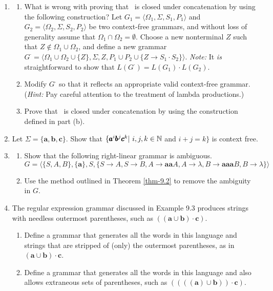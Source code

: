 \begin{enumerate}[{9.}1.]
\item \begin{enumerate}
\item What is wrong with proving that \CSIG\ is closed under concatenation by
using the following construction? Let $G_1 = \langle\Omega_1,\Sigma,S_1,P_1
\rangle$ and $G_2 = \langle\Omega_2,\Sigma,S_2,P_2\rangle$ be two context-free
grammars, and without loss of generality assume that $\Omega_1\cap\Omega_2 =
\emptyset$. Choose a new nonterminal $Z$ such that $Z\not \in\Omega_1\cup\Omega_2$,
and define a new grammar $G^{\cdot} = \langle\Omega_1\cup\Omega_2\cup\{Z\},\Sigma,Z,
P_1\cup P_2\cup\{Z\rightarrow S_1\cdot S_2\}\rangle$. \emph{Note:} It \emph{is}
straightforward to show that $L(G^{\cdot}) = L(G_1)\cdot L(G_2)$.
\item Modify $G^{\cdot}$ so that it reflects an appropriate valid context-free
grammar. (\emph{Hint:} Pay careful attention to the treatment of lambda
productions.)
\item Prove that \CSIG\ is closed under concatenation by using the construction
defined in part (b).
\end{enumerate}

\item Let $\Sigma=\{\pmb{a},\pmb{b},\pmb{c}\}$. Show that $\{\pmb{a}^i\pmb{b}^j
\pmb{c}^k|\ i,j,k\in\mathbb{N}$ and $i+j=k\}$ is context free.

\item \begin{enumerate}
\item Show that the following right-linear grammar is ambiguous.
\[ G=\langle\{S,A,B\},\{\pmb{a}\},S,\{S\rightarrow A,S\rightarrow B,A\rightarrow
\pmb{aa}A,A\rightarrow \lambda,B\rightarrow\pmb{aaa}B,B\rightarrow \lambda\}\rangle \]
\item Use the method outlined in Theorem \ref{thm-9.2} to remove the ambiguity in $G$.
\end{enumerate}

\item The regular expression grammar discussed in Example 9.3 produces strings
with needless outermost parentheses, such as $\pmb{((a\cup b)\cdot c)}$.
\begin{enumerate}
\item Define a grammar that generates all the words in this language and strings
that are stripped of (only) the outermost parentheses, as in $\pmb{(a\cup b)
\cdot c}$.
\item Define a grammar that generates all the words in this language and also
allows extraneous sets of parentheses, such as $\pmb{((((a)\cup b))\cdot c)}$.
\end{enumerate}


\end{enumerate}
